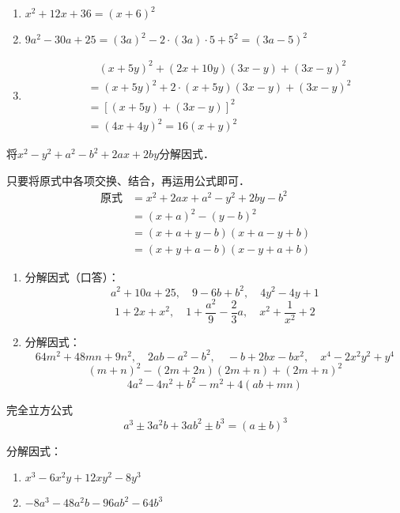 \begin{solution}
    \begin{enumerate}
        \item $x^2+12x+36=(x+6)^2$
        \item $9a^2-30a+25=(3a)^2-2\cdot (3a)\cdot 5+5^2=(3a-5)^2$
        \item \[\begin{split}
           &\quad  (x+5y)^2+(2x+10y)(3x-y)+(3x-y)^2\\
           &=(x+5y)^2+2\cdot (x+5y)(3x-y) +(3x-y) ^2\\
           &=[(x+5y) +(3x-y) ]^2\\
           &=(4x+4y)^2=16(x+y)^2          
        \end{split}\]
    \end{enumerate}
\end{solution}


\begin{example}
将$x^2-y^2+a^2-b^2+2ax+2by$分解因式．
\end{example}


\begin{solution}
    只要将原式中各项交换、结合，再运用公式即可．
\[\begin{split}
  \text{原式}&=x^2+2ax+a^2-y^2+2by-b^2\\
  &=(x+a)^2-(y-b)^2\\
  &=(x+a+y-b)(x+a-y+b)\\
  &=(x+y+a-b)(x-y+a+b)  
\end{split}\]
\end{solution}

\begin{ex}
\begin{enumerate}
    \item 分解因式（口答）：
    \[a^2+10a+25,\quad 9-6b+b^2,\quad 4y^2-4y+1\]
    \[1+2x+x^2,\quad 1+\frac{a^2}{9}-\frac{2}{3}a,\quad x^2+\frac{1}{x^2}+2\] 
    \item 分解因式：
     \[64m^2+48mn+9n^2,\quad 2ab-a^2-b^2,\quad -b+2bx-bx^2,\quad x^4-2x^2y^2+y^4\] 
     \[(m+n)^2-(2m+2n)(2m+n)+(2m+n)^2\]\[ 4a^2-4n^2+b^2-m^2+4(ab+mn) \]
\end{enumerate}
\end{ex}

\begin{blk}{完全立方公式}
\[a^3\pm 3a^2b+3ab^2\pm b^3=(a\pm b)^3\]
\end{blk}

\begin{example}
    分解因式：
    \begin{enumerate}
        \item $x^3-6x^2y+12xy^2-8y^3$
        \item $-8a^3-48a^2b-96ab^2-64b^3$
    \end{enumerate}
\end{example}


